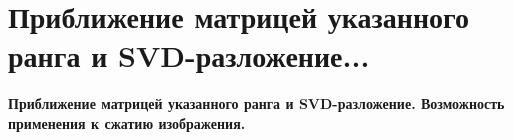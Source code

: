 \section{
 Приближение матрицей указанного ранга и SVD-разложение...
}

\textbf{Приближение матрицей указанного ранга и SVD-разложение. Возможность применения к сжатию изображения.}
